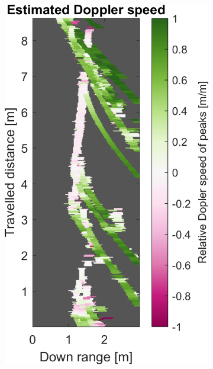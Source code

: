 \begin{figure}[htbp]
\begin{subfigure}[t]{0.475\linewidth}
        \includegraphics[width=\linewidth,max height=.475\textheight]{gfx/results/underground_doppler.png}
    \end{subfigure}\bigskip\\
    \begin{subfigure}[t]{0.475\linewidth}
        \centering

\end{subfigure}
\end{figure}
